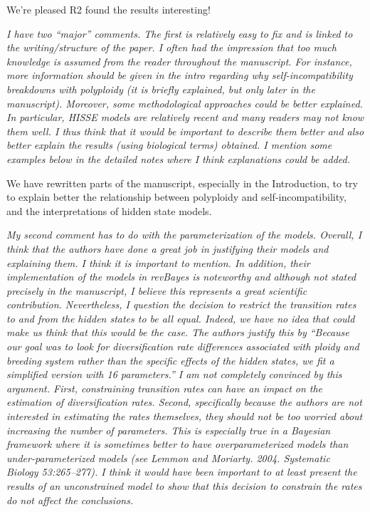 \documentclass[11pt]{article}
\renewenvironment{quote}{\bigskip\noindent\itshape\ignorespaces}{\smallskip}
\begin{document}
We're pleased R2 found the results interesting!


\begin{quote}
I have two ``major'' comments.
The first is relatively easy to fix and is linked to the writing/structure of the paper.
I often had the impression that too much knowledge is assumed from the reader throughout the manuscript.
For instance, more information should be given in the intro regarding why self-incompatibility breakdowns with polyploidy (it is briefly explained, but only later in the manuscript).
Moreover, some methodological approaches could be better explained.
In particular, HISSE models are relatively recent and many readers may not know them well.
I thus think that it would be important to describe them better and also better explain the results (using biological terms) obtained.
I mention some examples below in the detailed notes where I think explanations could be added.
\end{quote}

We have rewritten parts of the manuscript, especially in the Introduction, to try to explain better the relationship between polyploidy and self-incompatibility, and the interpretations of hidden state models.


\begin{quote}
My second comment has to do with the parameterization of the models.
Overall, I think that the authors have done a great job in justifying their models and explaining them.
I think it is important to mention.
In addition, their implementation of the models in revBayes is noteworthy and although not stated precisely in the manuscript, I believe this represents a great scientific contribution. 
Nevertheless, I question the decision to restrict the transition rates to and from the hidden states to be all equal.
Indeed, we have no idea that could make us think that this would be the case.
The authors justify this by ``Because our goal was to look for diversification rate differences associated with ploidy and breeding system rather than the specific effects of the hidden states, we fit a simplified version with 16 parameters.''
I am not completely convinced by this argument.
First, constraining transition rates can have an impact on the estimation of diversification rates.
Second, specifically because the authors are not interested in estimating the rates themselves, they should not be too worried about increasing the number of parameters.
This is especially true in a Bayesian framework where it is sometimes better to have overparameterized models than under-parameterized models (see Lemmon and Moriarty. 2004. Systematic Biology 53:265–277).
I think it would have been important to at least present the results of an unconstrained model to show that this decision to constrain the rates do not affect the conclusions.
\end{quote}
\end{document}
